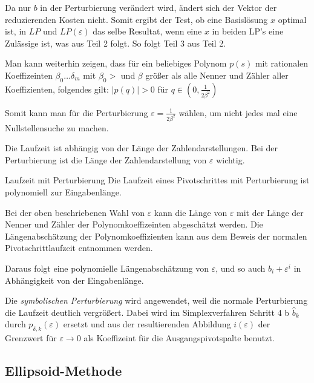 \documentclass{panikzettel}
\begin{document}
Da nur $b$ in der Perturbierung verändert wird, ändert sich der Vektor der reduzierenden Kosten nicht.
Somit ergibt der Test, ob eine Basislösung $x$ optimal ist, in $LP$ und $LP(\varepsilon)$ das selbe Resultat, wenn eine $x$ in beiden LP's eine Zulässige ist, was aus Teil 2 folgt.
So folgt Teil 3 aus Teil 2.

Man kann weiterhin zeigen, dass für ein beliebiges Polynom $p(s)$ mit rationalen Koeffizeinten $\beta_0 \ldots \delta_m$ mit $\beta_0 > $ und $\beta$ größer als alle Nenner und Zähler aller Koeffizienten, folgendes gilt:
$|p(q)| > 0$ für $q\in(0,\frac{1}{2\beta^2})$

Somit kann man für die Perturbierung $\varepsilon = \frac{1}{2\beta^2}$ wählen, um nicht jedes mal eine Nullstellensuche zu machen.

\begin{halfboxl}
Die Laufzeit ist abhängig von der Länge der Zahlendarstellungen. Bei der Perturbierung ist die Länge der Zahlendarstellung von $\varepsilon$ wichtig.

\end{halfboxl}%
\begin{halfboxr}
\vspace{-\baselineskip}
\begin{theo}{Laufzeit mit Perturbierung}
Die Laufzeit eines Pivotschrittes mit Perturbierung ist polynomiell zur Eingabenlänge.
\end{theo}
\end{halfboxr}

Bei der oben beschriebenen Wahl von $\varepsilon$ kann die Länge von $\varepsilon$ mit der Länge der Nenner und Zähler der Polynomkoeffizeinten abgeschätzt werden.
Die Längenabschätzung der Polynomkoeffizienten kann aus dem Beweis der normalen Pivotschrittlaufzeit entnommen werden.

Daraus folgt eine polynomielle Längenabschätzung von $\varepsilon$, und so auch $b_i + \varepsilon^i$ in Abhängigkeit von der Eingabenlänge.

Die \emph{symbolischen Perturbierung} wird angewendet, weil die normale Perturbierung die Laufzeit deutlich vergrößert.
Dabei wird im Simplexverfahren Schritt 4 b $\hat{b}_k$ durch $p_{\delta,k}(\varepsilon)$ ersetzt und aus der resultierenden Abbildung $i(\varepsilon)$ der Grenzwert für $\varepsilon \to 0$ als Koeffizeint für die Ausgangspivotspalte benutzt.

\subsection{Ellipsoid-Methode}
\end{document}

